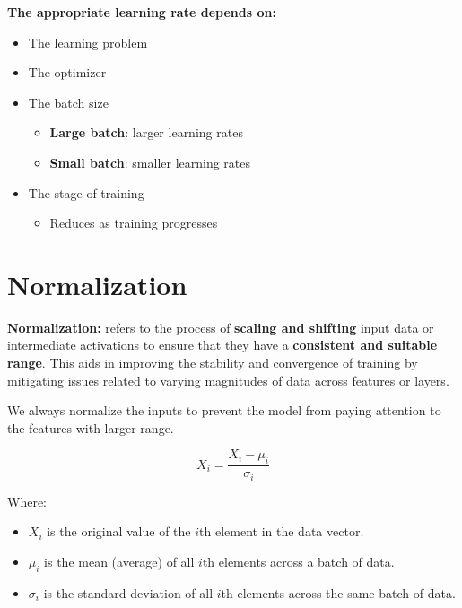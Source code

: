 \textbf{The appropriate learning rate depends on:}
\begin{itemize}
    \item The learning problem
    \item The optimizer
    \item The batch size
    \begin{itemize}
        \item \textbf{Large batch}: larger learning rates
        \item \textbf{Small batch}: smaller learning rates
    \end{itemize}
    \item The stage of training
    \begin{itemize}
        \item Reduces as training progresses
    \end{itemize}
\end{itemize}

\section{Normalization}

\begin{definition}
   \textbf{Normalization:} refers to the process of \textbf{scaling and shifting} input data or intermediate activations to ensure that they have a \textbf{consistent and suitable range}. This aids in improving the stability and convergence of training by mitigating issues related to varying magnitudes of data across features or layers.
\end{definition}
We always normalize the inputs to prevent the model from paying attention to the features with larger range.

\[X_i = \frac{X_i - \mu_i}{\sigma_i}\]

Where:
\begin{itemize}
  \item $X_i$ is the original value of the $i$th element in the data vector.
  \item $\mu_i$ is the mean (average) of all $i$th elements across a batch of data.
  \item $\sigma_i$ is the standard deviation of all $i$th elements across the same batch of data.
\end{itemize}

